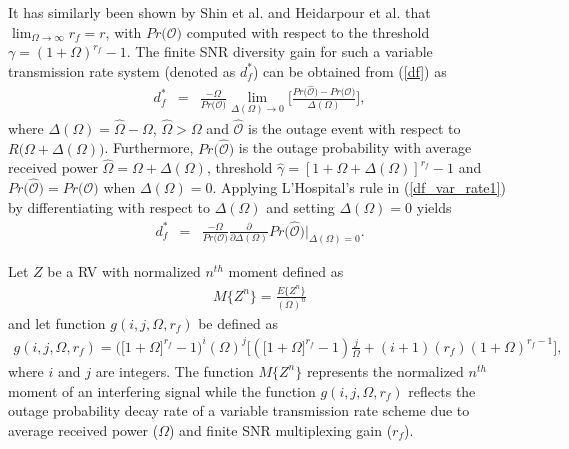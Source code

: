 It has similarly been shown by Shin et al. \cite{shin2008diversity} and Heidarpour et al. \cite{heidarpour2017finite} that $\lim_{\Omega\to\infty}r_f = r$, with $Pr\big(\mathcal{O}\big)$ computed with respect to the threshold $\gamma=(1+\Omega)^{r_f}-1$. The finite SNR diversity gain for such a variable transmission rate system (denoted as $d_{f}^{*}$) can be obtained from (\ref{df}) as \cite[eq. (36)]{shin2008diversity}
\begin{eqnarray}
d_f^* & = & \frac{-\Omega}{Pr\big(\mathcal{O}\big)} \lim_{\Delta(\Omega)\to0} \Big[\frac{Pr\big(\mathcal{\widehat{O}}\big) - Pr\big(\mathcal{O}\big)}{\Delta(\Omega)}\Big] \label{df_var_rate1}, 
\end{eqnarray}
where $\Delta(\Omega)=\widehat{\Omega}-\Omega$, $\widehat{\Omega}>\Omega$ and $\mathcal{\widehat{O}}$ is the outage event with respect to $R\big(\Omega+\Delta(\Omega)\big)$. Furthermore, $Pr\big(\mathcal{\widehat{O}}\big)$ is the outage probability with average received power $\widehat{\Omega}=\Omega+\Delta(\Omega)$, threshold $\widehat{\gamma}=[1+\Omega+\Delta(\Omega)]^{r_f}-1$ and $Pr\big(\mathcal{\widehat{O}}\big)=Pr\big(\mathcal{O}\big)$ when $\Delta(\Omega)=0$. Applying L'Hospital's rule in (\ref{df_var_rate1}) by differentiating with respect to $\Delta(\Omega)$ and setting $\Delta(\Omega)=0$ yields
\begin{eqnarray} 
d_f^* & = & \frac{-\Omega}{Pr\big(\mathcal{O}\big)} \frac{\partial}{\partial\Delta(\Omega)} Pr\big(\mathcal{\widehat{O}}\big) \Bigg|_{\Delta(\Omega)=0}. \label{df_var_rate2}
\end{eqnarray}

Let $Z$ be a RV with normalized $n^{th}$ moment defined as
\begin{eqnarray} \label{norm_moment}
M\{Z^{n}\}=\frac{E\{Z^{n}\}}{(\Omega)^{n}}
\end{eqnarray}
and let function $g(i,j,\Omega,r_f)$ be defined as
\begin{eqnarray} \label{g_func}
g(i,j,\Omega,r_f) = \big(\big[1 + \Omega\big]^{r_f}-1\big)^{i} (\Omega)^{j} \bigg[ \left(\big[1 + \Omega\big]^{r_f} - 1\right) \frac{j}{\Omega} + (i+1)(r_f)(1 + \Omega)^{r_f-1} \bigg],
\end{eqnarray}
where $i$ and $j$ are integers. The function $M\{Z^{n}\}$ represents the normalized $n^{th}$ moment of an interfering signal while the function $g(i,j,\Omega,r_f)$ reflects the outage probability decay rate of a variable transmission rate scheme due to average received power ($\Omega$) and finite SNR multiplexing gain ($r_f$).

